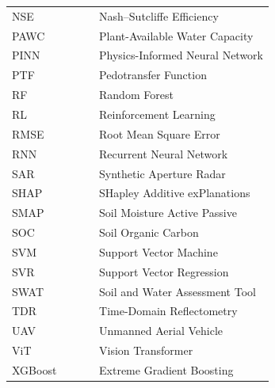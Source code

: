 \documentclass[land,review,accept,pdftex,oneauthor]{Definitions/mdpi}
\begin{document}
{\noindent 
\begin{tabular}{@{}ll}
NSE  & ~~~~~ Nash--Sutcliffe Efficiency\\
PAWC & ~~~~~ Plant-Available Water Capacity\\
PINN & ~~~~~ Physics-Informed Neural Network\\
PTF  & ~~~~~ Pedotransfer Function\\
RF   & ~~~~~ Random Forest\\
RL   & ~~~~~ Reinforcement Learning\\
RMSE & ~~~~~ Root Mean Square Error\\
RNN  & ~~~~~ Recurrent Neural Network\\
SAR  & ~~~~~ Synthetic Aperture Radar\\
SHAP & ~~~~~ SHapley Additive exPlanations\\
SMAP & ~~~~~ Soil Moisture Active Passive\\
SOC  & ~~~~~ Soil Organic Carbon\\
SVM  & ~~~~~ Support Vector Machine\\
SVR  & ~~~~~ Support Vector Regression\\
SWAT & ~~~~~ Soil and Water Assessment Tool\\
TDR  & ~~~~~ Time-Domain Reflectometry\\
UAV  & ~~~~~ Unmanned Aerial Vehicle\\
ViT  & ~~~~~ Vision Transformer\\
XGBoost & ~~~~~ Extreme Gradient Boosting\\
\end{tabular}
}
\end{document}
